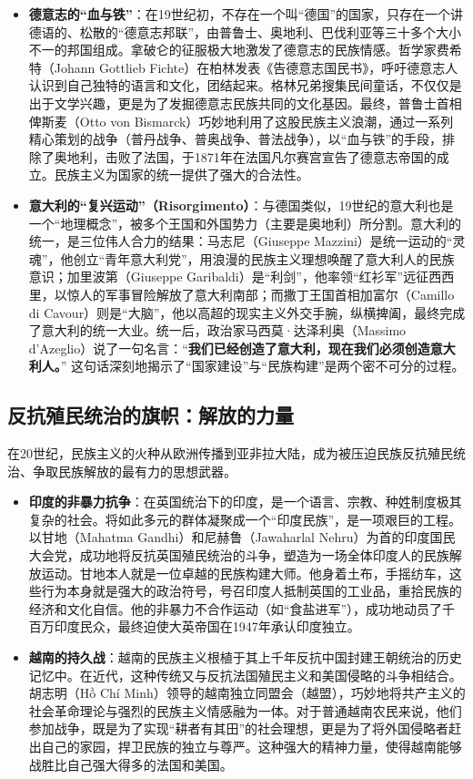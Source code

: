 \begin{itemize}[noitemsep,topsep=0pt]
    \item \textbf{德意志的“血与铁”}：在19世纪初，不存在一个叫“德国”的国家，只存在一个讲德语的、松散的“德意志邦联”，由普鲁士、奥地利、巴伐利亚等三十多个大小不一的邦国组成。拿破仑的征服极大地激发了德意志的民族情感。哲学家费希特（Johann Gottlieb Fichte）在柏林发表《告德意志国民书》，呼吁德意志人认识到自己独特的语言和文化，团结起来。格林兄弟搜集民间童话，不仅仅是出于文学兴趣，更是为了发掘德意志民族共同的文化基因。最终，普鲁士首相俾斯麦（Otto von Bismarck）巧妙地利用了这股民族主义浪潮，通过一系列精心策划的战争（普丹战争、普奥战争、普法战争），以“血与铁”的手段，排除了奥地利，击败了法国，于1871年在法国凡尔赛宫宣告了德意志帝国的成立。民族主义为国家的统一提供了强大的合法性。
    \item \textbf{意大利的“复兴运动”（Risorgimento）}：与德国类似，19世纪的意大利也是一个“地理概念”，被多个王国和外国势力（主要是奥地利）所分割。意大利的统一，是三位伟人合力的结果：马志尼（Giuseppe Mazzini）是统一运动的“灵魂”，他创立“青年意大利党”，用浪漫的民族主义理想唤醒了意大利人的民族意识；加里波第（Giuseppe Garibaldi）是“利剑”，他率领“红衫军”远征西西里，以惊人的军事冒险解放了意大利南部；而撒丁王国首相加富尔（Camillo di Cavour）则是“大脑”，他以高超的现实主义外交手腕，纵横捭阖，最终完成了意大利的统一大业。统一后，政治家马西莫·达泽利奥（Massimo d'Azeglio）说了一句名言：“\textbf{我们已经创造了意大利，现在我们必须创造意大利人。}” 这句话深刻地揭示了“国家建设”与“民族构建”是两个密不可分的过程。
\end{itemize}

\subsection{ 反抗殖民统治的旗帜：解放的力量}

在20世纪，民族主义的火种从欧洲传播到亚非拉大陆，成为被压迫民族反抗殖民统治、争取民族解放的最有力的思想武器。

\begin{itemize}[noitemsep,topsep=0pt]
    \item \textbf{印度的非暴力抗争}：在英国统治下的印度，是一个语言、宗教、种姓制度极其复杂的社会。将如此多元的群体凝聚成一个“印度民族”，是一项艰巨的工程。以甘地（Mahatma Gandhi）和尼赫鲁（Jawaharlal Nehru）为首的印度国民大会党，成功地将反抗英国殖民统治的斗争，塑造为一场全体印度人的民族解放运动。甘地本人就是一位卓越的民族构建大师。他身着土布，手摇纺车，这些行为本身就是强大的政治符号，号召印度人抵制英国的工业品，重拾民族的经济和文化自信。他的非暴力不合作运动（如“食盐进军”），成功地动员了千百万印度民众，最终迫使大英帝国在1947年承认印度独立。
    \item \textbf{越南的持久战}：越南的民族主义根植于其上千年反抗中国封建王朝统治的历史记忆中。在近代，这种传统又与反抗法国殖民主义和美国侵略的斗争相结合。胡志明（Hồ Chí Minh）领导的越南独立同盟会（越盟），巧妙地将共产主义的社会革命理论与强烈的民族主义情感融为一体。对于普通越南农民来说，他们参加战争，既是为了实现“耕者有其田”的社会理想，更是为了将外国侵略者赶出自己的家园，捍卫民族的独立与尊严。这种强大的精神力量，使得越南能够战胜比自己强大得多的法国和美国。
\end{itemize}


